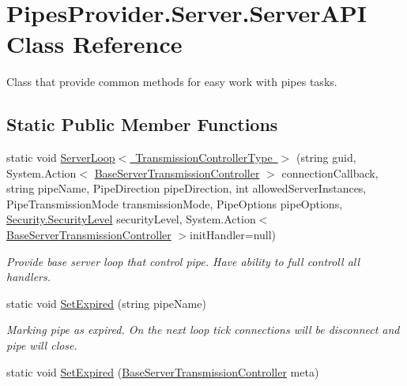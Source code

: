 \hypertarget{class_pipes_provider_1_1_server_1_1_server_a_p_i}{}\section{Pipes\+Provider.\+Server.\+Server\+A\+PI Class Reference}
\label{class_pipes_provider_1_1_server_1_1_server_a_p_i}


Class that provide common methods for easy work with pipes\textquotesingle{} tasks.  


\subsection*{Static Public Member Functions}
\begin{DoxyCompactItemize}
\item 
static void \mbox{\hyperlink{class_pipes_provider_1_1_server_1_1_server_a_p_i_aaf9afb864cf452d3842f0a6546569a32}{Server\+Loop$<$ Transmission\+Controller\+Type $>$}} (string guid, System.\+Action$<$ \mbox{\hyperlink{class_pipes_provider_1_1_server_1_1_transmission_controllers_1_1_base_server_transmission_controller}{Base\+Server\+Transmission\+Controller}} $>$ connection\+Callback, string pipe\+Name, Pipe\+Direction pipe\+Direction, int allowed\+Server\+Instances, Pipe\+Transmission\+Mode transmission\+Mode, Pipe\+Options pipe\+Options, \mbox{\hyperlink{namespace_pipes_provider_1_1_security_a1a6020eca1c661a6f7140e8260502d7e}{Security.\+Security\+Level}} security\+Level, System.\+Action$<$ \mbox{\hyperlink{class_pipes_provider_1_1_server_1_1_transmission_controllers_1_1_base_server_transmission_controller}{Base\+Server\+Transmission\+Controller}} $>$init\+Handler=null)
\begin{DoxyCompactList}\small\item\em Provide base server loop that control pipe. Have ability to full controll all handlers. \end{DoxyCompactList}\item 
static void \mbox{\hyperlink{class_pipes_provider_1_1_server_1_1_server_a_p_i_a750e3c4f0e34e61724ab3914d0d0608e}{Set\+Expired}} (string pipe\+Name)
\begin{DoxyCompactList}\small\item\em Marking pipe as expired. On the next loop tick connections will be disconnect and pipe will close. \end{DoxyCompactList}\item 
static void \mbox{\hyperlink{class_pipes_provider_1_1_server_1_1_server_a_p_i_a9adcab99d6a6b7e4185203afb74dc575}{Set\+Expired}} (\mbox{\hyperlink{class_pipes_provider_1_1_server_1_1_transmission_controllers_1_1_base_server_transmission_controller}{Base\+Server\+Transmission\+Controller}} meta)

\end{DoxyCompactItemize}

